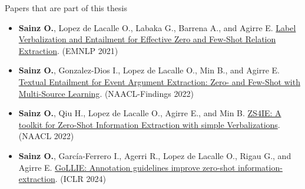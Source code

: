 \documentclass[
    11pt,
    notheorems,
    xcolor={dvipsnames},
    hyperref={
        pdfstartview=FitH, 
        pdftitle={Ikasketa-adibide urriko Informazio-Erauzketa}, 
        pdfauthor={Oscar Sainz Jimenez}, 
        citecolor=secondary, 
    }
]{beamer}
\begin{document}
\begin{frame}
    \begin{block}{Papers that are part of this thesis}
        \begin{itemize}
            \item \small{\textbf{Sainz O.}, Lopez de Lacalle O., Labaka G., Barrena A., and Agirre E. \href{https://doi.org/10.18653/v1/2021.emnlp-main.92}{\textcolor{primary}{Label Verbalization and Entailment for Effective Zero and Few-Shot Relation Extraction}}. (EMNLP 2021)}
            \item \small{\textbf{Sainz O.}, Gonzalez-Dios I., Lopez de Lacalle O., Min B., and Agirre E. \href{https://doi.org/10.18653/v1/2022.findings-naacl.187}{\textcolor{primary}{Textual Entailment for Event Argument Extraction: Zero- and Few-Shot with Multi-Source Learning}}. (NAACL-Findings 2022)}
            \item \small{\textbf{Sainz O.}, Qiu H., Lopez de Lacalle O., Agirre E., and Min B. \href{https://doi.org/10.18653/v1/2022.naacl-demo.4}{\textcolor{primary}{ZS4IE: A toolkit for Zero-Shot Information Extraction with simple Verbalizations}}. (NAACL 2022)}
            \item \small{\textbf{Sainz O.}, García-Ferrero I., Agerri R., Lopez de Lacalle O., Rigau G., and Agirre E. \href{https://openreview.net/forum?id=Y3wpuxd7u9}{\textcolor{primary}{GoLLIE: Annotation guidelines improve zero-shot information-extraction}}. (ICLR 2024)}
        \end{itemize}
    \end{block}

\end{frame}
\end{document}

